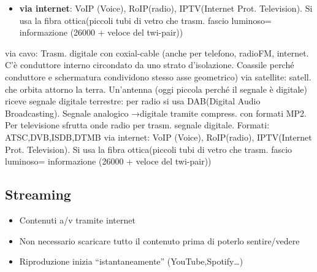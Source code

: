 \documentclass[8pt,a4paper]{article}
\begin{document}
\begin{multicols}{5}
\begin{itemize}
\begin{itemize}
        \item \textbf{via internet}: VoIP (Voice), RoIP(radio), IPTV(Internet Prot. Television). Si usa la fibra ottica(piccoli tubi di vetro che trasm. fascio luminoso= informazione (26000 + veloce del twi-pair))
      \end{itemize}
    \end{itemize}
    via cavo: Trasm. digitale con coxial-cable (anche per telefono, radioFM, internet. C’è conduttore interno circondato da uno strato d’isolazione. Coassile perché conduttore e schermatura condividono stesso asse geometrico)
    via satellite: satell. che orbita attorno la terra. Un’antenna (oggi piccola perché il segnale è digitale) riceve segnale
    digitale terrestre: per radio si usa DAB(Digital Audio Broadcasting). Segnale analogico →digitale tramite compress. con formati MP2. Per televisione sfrutta onde radio per trasm. segnale digitale. Formati: ATSC,DVB,ISDB,DTMB
    via internet: VoIP (Voice), RoIP(radio), IPTV(Internet Prot. Television). Si usa la fibra ottica(piccoli tubi di vetro che trasm. fascio luminoso= informazione (26000 + veloce del twi-pair))

    \subsection{Streaming}
    \begin{itemize}
      \item Contenuti a/v tramite internet
      \item Non necessario scaricare tutto il contenuto prima di poterlo sentire/vedere
      \item Riproduzione inizia “istantaneamente” (YouTube,Spotify…)
    \end{itemize}


\end{multicols}
\end{document}
